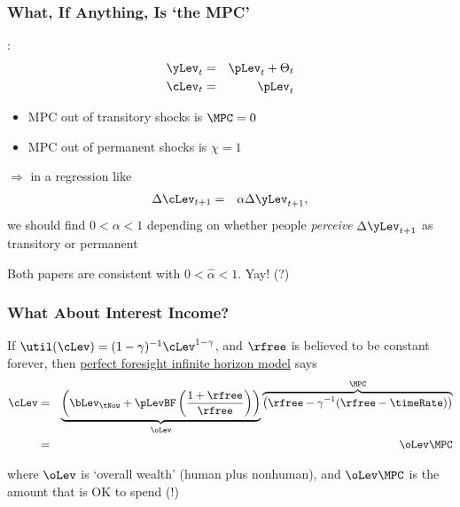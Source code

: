\documentclass[public]{cfpbpresentation}
\renewcommand{\CRRA}{\gamma}
\begin{document}
\begin{frame}\frametitle{What, If Anything, Is `the MPC'}

\cite{friedmanATheory}:
\begin{eqnarray*}
    \yLev_{t} & = & \pLev_{t} + \Theta_{t}
\\  \cLev_{t} & = & \pLev_{t}
\end{eqnarray*}


\begin{itemize}
\item MPC out of transitory shocks is $\MPC = 0$
\item MPC out of permanent shocks is $\chi = 1$
\end{itemize}

\pause 
$\Rightarrow$ in a regression like
\begin{eqnarray*}
  \Delta \cLev_{t+1} & = & \alpha  \Delta \yLev_{t+1},
\end{eqnarray*}
we should find $0 < \alpha < 1$ depending on whether people {\it perceive}
$\Delta \yLev_{t+1}$ as transitory or permanent

\pause 

\vspace{0.1in}
Both papers are consistent with $0 < \hat{\alpha} < 1$.  Yay! (?)

\end{frame}

\begin{frame}\frametitle{What About Interest Income? }

If $\util(\cLev) = (1-\CRRA)^{-1}\cLev^{1-\CRRA}$, and $\rfree$ is believed to be constant forever, 
then \href{http://econ.jhu.edu/people/ccarroll/public/lecturenotes/consumption/PerfForesightCRRA}{perfect foresight infinite horizon model} says 
\begin{eqnarray*}
        \cLev & = & \underbrace{\left(\bLev_{\tNow}+ \pLevBF\left(\frac{1+\rfree}{\rfree}\right)\right)}_{\oLev}\overbrace{\left(\rfree-\CRRA^{-1}(\rfree-\timeRate)\right)}^{\MPC}
\\ & = & \oLev \MPC 
\end{eqnarray*}

\medskip\medskip
\pause
where $\oLev$ is `overall wealth' (human plus nonhuman), and $\oLev \MPC$ is the amount that is OK to spend (!)  

\end{frame}
\end{document}
